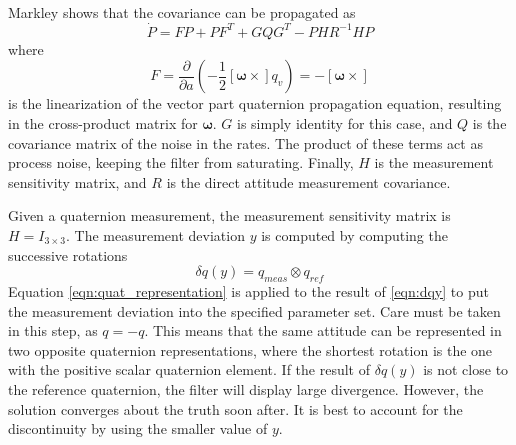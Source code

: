 \documentclass[]{aiaa-tc}%
\begin{document}
Markley\cite{MarkleyAtt} shows that the covariance can be propagated as 
\begin{equation}
\dot{P}=FP+PF^T+GQG^T-PHR^{-1}HP
\label{eqn:covariance_dot}
\end{equation}
\noindent where
\begin{equation}
F = \frac{\partial }{\partial a} \left (-\frac{1}{2}[\boldsymbol{\omega}\times]  q_v\right )=-[\boldsymbol{\omega}\times]
\label{eqn:F}
\end{equation}
\noindent is the linearization of the vector part quaternion propagation equation, resulting in the cross-product matrix for $\boldsymbol{\omega}$. $G$ is simply identity for this case, and $Q$ is the covariance matrix of the noise in the rates. The product of these terms act as process noise, keeping the filter from saturating. Finally, $H$ is the measurement sensitivity matrix, and $R$ is the direct attitude measurement covariance.

	\vspace{5 mm}

Given a quaternion measurement, the measurement sensitivity matrix is $H=I_{3\times 3}$. The measurement deviation $y$ is computed by computing the successive rotations
\begin{equation}
\delta q(y)=q_{meas}\otimes q_{ref}
\label{eqn:dqy}
\end{equation}
\noindent Equation \ref{eqn:quat_representation} is applied to the result of \ref{eqn:dqy} to put the measurement deviation into the specified parameter set. Care must be taken in this step, as $q=-q$. This means that the same attitude can be represented in two opposite quaternion representations, where the shortest rotation is the one with the positive scalar quaternion element. If the result of $\delta q(y)$ is not close to the reference quaternion, the filter will display large divergence. However, the solution converges about the truth soon after. It is best to account for the discontinuity by using the smaller value of $y$.

	\vspace{5 mm}
\end{document}
